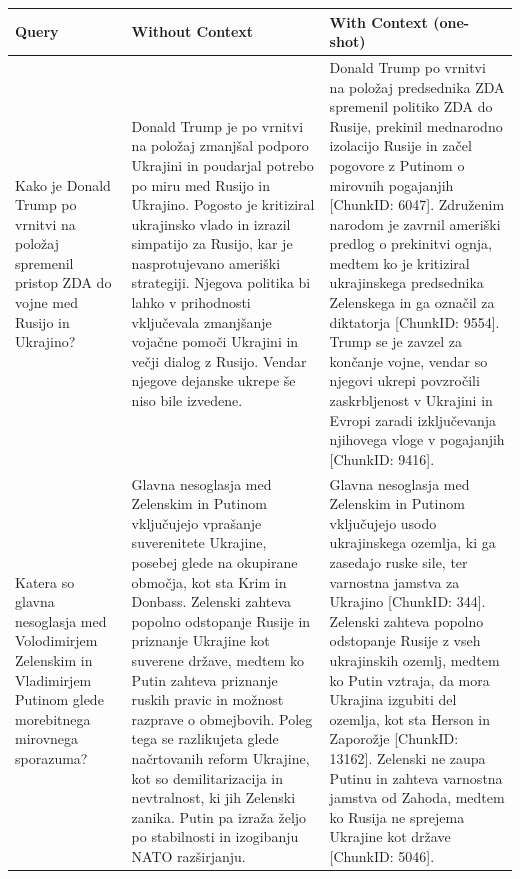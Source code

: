 \documentclass[conference]{IEEEtran}
\begin{document}
\begin{longtable}{p{} p{} p{}}
\hline
\textbf{Query} & \textbf{Without Context} & \textbf{With Context (one-shot)} \\
\hline
Kako je Donald Trump po vrnitvi na položaj spremenil pristop ZDA do vojne med Rusijo in Ukrajino? & Donald Trump je po vrnitvi na položaj zmanjšal podporo Ukrajini in poudarjal potrebo po miru med Rusijo in Ukrajino. Pogosto je kritiziral ukrajinsko vlado in izrazil simpatijo za Rusijo, kar je nasprotujevano ameriški strategiji. Njegova politika bi lahko v prihodnosti vključevala zmanjšanje vojačne pomoči Ukrajini in večji dialog z Rusijo. Vendar njegove dejanske ukrepe še niso bile izvedene. & Donald Trump po vrnitvi na položaj predsednika ZDA spremenil politiko ZDA do Rusije, prekinil mednarodno izolacijo Rusije in začel pogovore z Putinom o mirovnih pogajanjih [ChunkID: 6047]. Združenim narodom je zavrnil ameriški predlog o prekinitvi ognja, medtem ko je kritiziral ukrajinskega predsednika Zelenskega in ga označil za diktatorja [ChunkID: 9554]. Trump se je zavzel za končanje vojne, vendar so njegovi ukrepi povzročili zaskrbljenost v Ukrajini in Evropi zaradi izključevanja njihovega vloge v pogajanjih [ChunkID: 9416]. \\ \hline
Katera so glavna nesoglasja med Volodimirjem Zelenskim in Vladimirjem Putinom glede morebitnega mirovnega sporazuma? & Glavna nesoglasja med Zelenskim in Putinom vključujejo vprašanje suverenitete Ukrajine, posebej glede na okupirane območja, kot sta Krim in Donbass. Zelenski zahteva popolno odstopanje Rusije in priznanje Ukrajine kot suverene države, medtem ko Putin zahteva priznanje ruskih pravic in možnost razprave o obmejbovih. Poleg tega se razlikujeta glede načrtovanih reform Ukrajine, kot so demilitarizacija in nevtralnost, ki jih Zelenski zanika. Putin pa izraža željo po stabilnosti in izogibanju NATO razširjanju. & Glavna nesoglasja med Zelenskim in Putinom vključujejo usodo ukrajinskega ozemlja, ki ga zasedajo ruske sile, ter varnostna jamstva za Ukrajino [ChunkID: 344]. Zelenski zahteva popolno odstopanje Rusije z vseh ukrajinskih ozemlj, medtem ko Putin vztraja, da mora Ukrajina izgubiti del ozemlja, kot sta Herson in Zaporožje [ChunkID: 13162]. Zelenski ne zaupa Putinu in zahteva varnostna jamstva od Zahoda, medtem ko Rusija ne sprejema Ukrajine kot države [ChunkID: 5046]. \\ \hline

\end{longtable}
\end{document}
